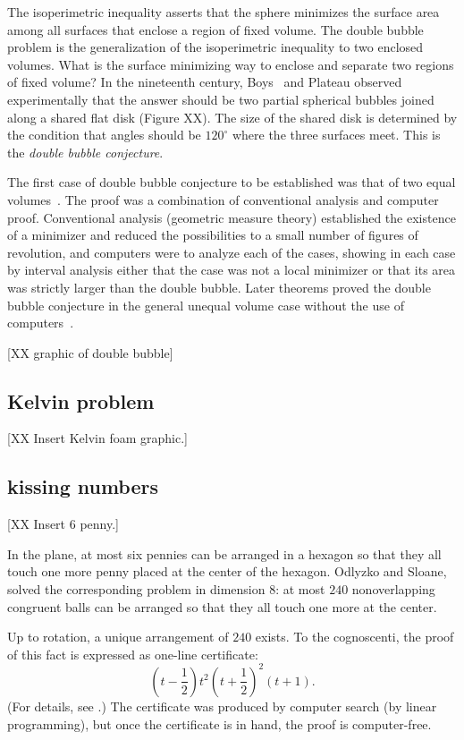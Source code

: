 \documentclass{llncs}
\begin{document}
The isoperimetric inequality asserts that the sphere minimizes the
surface area among all surfaces that enclose a region of fixed volume.
The double bubble problem is the generalization of the isoperimetric
inequality to two enclosed volumes.  What is the surface minimizing way
to enclose and separate two regions of fixed volume?  In the
nineteenth century, Boys~\cite{Boy1890} and Plateau observed
experimentally that the answer should be two partial spherical bubbles
joined along a shared flat disk (Figure XX).  The size of the shared
disk is determined by the condition that angles should be $120^\circ$
where the three surfaces meet.  This is the {\it double bubble
  conjecture}.

The first case of double bubble conjecture to be established was that
of two equal volumes~\cite{HHS95}.  The proof was a combination of conventional
analysis and computer proof.  Conventional analysis (geometric measure
theory) established the existence of a minimizer and reduced the
possibilities to a small number of figures of revolution, and
computers were to analyze each of the cases, showing in each case by
interval analysis either that the case was not a local minimizer or
that its area was strictly larger than the double bubble.  Later
theorems proved the double bubble conjecture in the general unequal
volume case without the use of computers~\cite{HMRR}.

[XX graphic of double bubble]


\subsection{Kelvin problem}

[XX Insert Kelvin foam graphic.]



\subsection{kissing numbers} %

[XX Insert 6 penny.]

In the plane, at most six pennies can be arranged in a hexagon so that they
all touch one more penny placed at the center of the hexagon.  Odlyzko
and Sloane, solved the corresponding problem in dimension $8$: at most
$240$ nonoverlapping congruent balls can be arranged so that they all
touch one more at the center.  

 Up to rotation, a unique arrangement of
$240$ exists.  To the cognoscenti, the proof of this fact is expressed as one-line certificate:
\[
(t - \frac{1}{2})t^2(t + \frac{1}{2})^2 (t + 1).
\]
(For details, see \cite{PZ}.)
The certificate was produced by computer search (by linear programming), but once
the certificate is in hand, the proof is computer-free.
\end{document}

